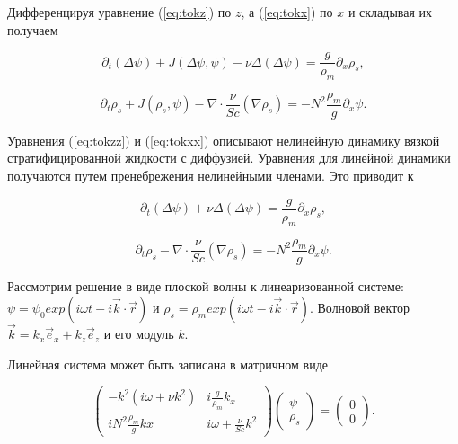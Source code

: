 Дифференцируя уравнение (\ref{eq:tokz}) по $z$, а (\ref{eq:tokx}) по $x$ и складывая их получаем

\begin{equation}
    \partial_t(\Delta \psi) + J (\Delta \psi, \psi) - \nu \Delta (\Delta \psi) = \frac{g}{\rho_m} \partial_x \rho_s,
    \label{eq:tokzz}
\end{equation}

\begin{equation}
    \partial_t \rho_s + J(\rho_s,\psi) - \nabla \cdot \frac{\nu}{Sc} (\nabla \rho_s) = -N^2 \frac{\rho_m}{g}\partial_x \psi.
    \label{eq:tokxx}
\end{equation}

Уравнения (\ref{eq:tokzz}) и (\ref{eq:tokxx}) описывают нелинейную динамику вязкой стратифицированной жидкости с диффузией. Уравнения для линейной динамики получаются путем пренебрежения нелинейными членами. Это приводит к

\begin{equation}
    \partial_t(\Delta \psi) + \nu \Delta (\Delta \psi) = \frac{g}{\rho_m} \partial_x \rho_s,
\end{equation}

\begin{equation}
    \partial_t \rho_s - \nabla \cdot \frac{\nu}{Sc} (\nabla \rho_s) = -N^2 \frac{\rho_m}{g}\partial_x \psi.
\end{equation}

Рассмотрим решение в виде плоской волны к линеаризованной системе: $\psi = \psi_0 exp(i\omega t - i \vec{k} \cdot \vec{r})$ и $\rho_s=\rho_m exp(i\omega t - i \vec{k}\cdot \vec{r})$. Волновой вектор $\vec{k}=k_x \vec{e}_x + k_z \vec{e}_z$ и его модуль $k$.

Линейная система может быть записана в матричном виде

\begin{equation}
    \left(\begin{array}{cc} -k^2(i\omega + \nu k^2) & i \frac{g}{\rho_m}k_x
    \\[15pt] iN^2 \frac{\rho_m}{g}kx & i\omega + \frac{\nu}{Sc} k^2 \end{array}\right)
    \left(\begin{array}{c}\psi \\[15pt] \rho_s\end{array}\right) = 
    \left(\begin{array}{c}0 \\[15pt] 0\end{array}\right).
\end{equation}

